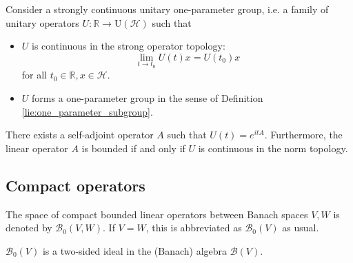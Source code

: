     \begin{theorem}[Stone]\label{functional:stone}
        Consider a strongly continuous unitary one-parameter group, i.e. a family of unitary operators $U:\mathbb{R}\rightarrow\mathrm{U}(\mathcal{H})$ such that
        \begin{itemize}
            \item $U$ is continuous in the strong operator topology: \[\lim_{t\rightarrow t_0}U(t)x=U(t_0)x\] for all $t_0\in\mathbb{R}, x\in\mathcal{H}$.
            \item $U$ forms a one-parameter group in the sense of Definition \ref{lie:one_parameter_subgroup}.
        \end{itemize}
        There exists a self-adjoint operator $A$ such that $U(t)=e^{itA}$. Furthermore, the linear operator $A$ is bounded if and only if $U$ is continuous in the norm topology.
    \end{theorem}

\subsection{Compact operators}



    \begin{notation}
        The space of compact bounded linear operators between Banach spaces $V,W$ is denoted by $\mathcal{B}_0(V,W)$. If $V=W$, this is abbreviated as $\mathcal{B}_0(V)$ as usual.
    \end{notation}
    \begin{property}
        $\mathcal{B}_0(V)$ is a two-sided ideal in the (Banach) algebra $\mathcal{B}(V)$.
    \end{property}

